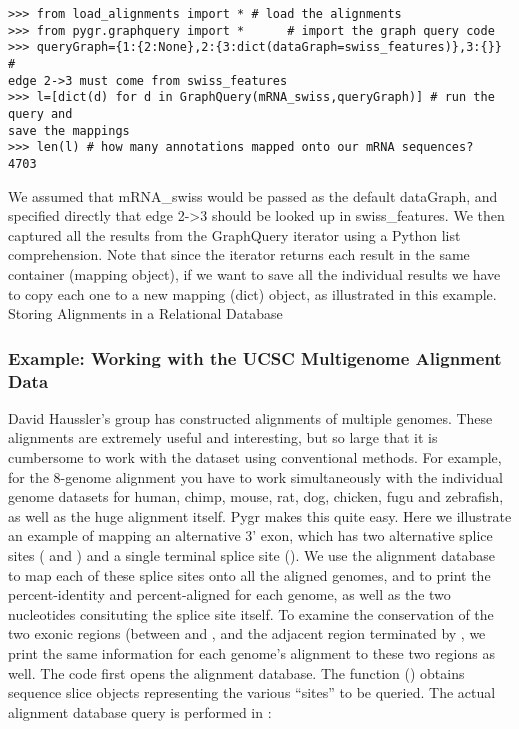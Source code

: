 \documentclass{howto}
\begin{document}
\begin{verbatim}
>>> from load_alignments import * # load the alignments
>>> from pygr.graphquery import *      # import the graph query code
>>> queryGraph={1:{2:None},2:{3:dict(dataGraph=swiss_features)},3:{}} # 
edge 2->3 must come from swiss_features
>>> l=[dict(d) for d in GraphQuery(mRNA_swiss,queryGraph)] # run the query and 
save the mappings
>>> len(l) # how many annotations mapped onto our mRNA sequences?
4703
\end{verbatim}

We assumed that mRNA_swiss would be passed as the default dataGraph, and specified directly that edge 2->3 should be looked up in swiss_features.  We then captured all the results from the GraphQuery iterator using a Python list comprehension.  Note that since the iterator returns each result in the same container (mapping object), if we want to save all the individual results we have to copy each one to a new mapping (dict) object, as illustrated in this example.
Storing Alignments in a Relational Database

\subsubsection{Example: Working with the UCSC Multigenome Alignment Data}

David Haussler's group has constructed alignments of multiple genomes.  These alignments are extremely useful and interesting, but so large that it is cumbersome to work with the dataset using conventional methods.  For example, for the 8-genome alignment you have to work simultaneously with the individual genome datasets for human, chimp, mouse, rat, dog, chicken, fugu and zebrafish, as well as the huge alignment itself.  Pygr makes this quite easy.  Here we illustrate an example of mapping an alternative 3' exon, which has two alternative splice sites
( and ) and a single terminal splice site ().
We use the alignment database to map each of these splice sites onto all the aligned
genomes, and to print the percent-identity and percent-aligned for each genome,
as well as the two nucleotides consituting the splice site itself.
To examine the conservation of the two exonic regions (between 
and , and the adjacent region terminated by , 
we print the same information for each genome's alignment to these two regions as well.
The code first opens the alignment database.  The function ()
obtains sequence slice objects representing the various ``sites'' to be queried.
The actual alignment database query is performed in :
\end{document}
